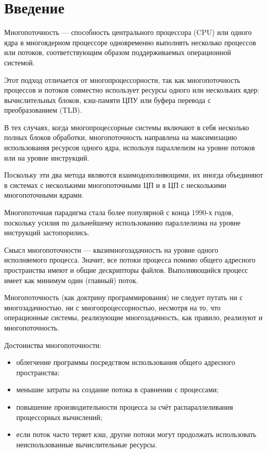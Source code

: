 \documentclass[12pt]{report}
\begin{document}
    
    \tableofcontents

    \newpage
    \chapter*{Введение}

    Многопоточность — способность центрального процессора (CPU) или одного ядра
    в многоядерном процессоре одновременно выполнять несколько процессов или
    потоков, соответствующим образом поддерживаемых операционной системой.

    Этот подход отличается от многопроцессорности, так как многопоточность
    процессов и потоков совместно использует ресурсы одного или нескольких ядер:
    вычислительных блоков, кэш-памяти ЦПУ или буфера перевода с преобразованием (TLB).

    В тех случаях, когда многопроцессорные системы включают в себя несколько полных блоков обработки,
    многопоточность направлена на максимизацию использования ресурсов одного ядра,
    используя параллелизм на уровне потоков или на уровне инструкций.

    Поскольку эти два метода являются взаимодополняющими,
    их иногда объединяют в системах с несколькими многопоточными ЦП
    и в ЦП с несколькими многопоточными ядрами.

    Многопоточная парадигма стала более популярной с конца 1990-х годов,
    поскольку усилия по дальнейшему использованию параллелизма на уровне инструкций застопорились.

    Смысл многопоточности — квазимногозадачность на уровне одного исполняемого процесса.
    Значит, все потоки процесса помимо общего адресного пространства имеют и общие дескрипторы файлов.
    Выполняющийся процесс имеет как минимум один (главный) поток.

    Многопоточность (как доктрину программирования) не следует путать ни с многозадачностью,
    ни с многопроцессорностью, несмотря на то, что операционные системы,
    реализующие многозадачность, как правило, реализуют и многопоточность.

    Достоинства многопоточности:

    \begin{itemize}
        \item облегчение программы посредством использования общего адресного пространства;
        \item меньшие затраты на создание потока в сравнении с процессами;
        \item повышение производительности процесса за счёт распараллеливания процессорных вычислений;
        \item если поток часто теряет кэш, другие потоки могут продолжать
        использовать неиспользованные вычислительные ресурсы.
    \end{itemize}
\end{document}
